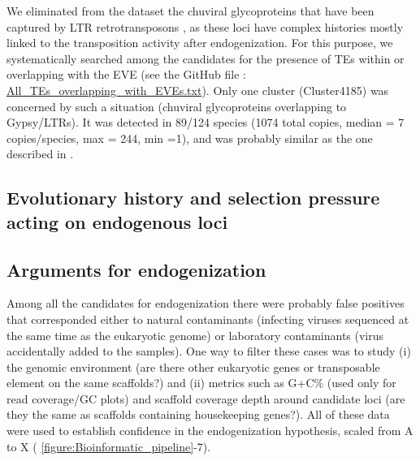 We eliminated from the dataset the chuviral glycoproteins that have been captured by LTR retrotransposons \citep{dezordi_and_2020}, as these loci have complex histories mostly linked to the transposition activity after endogenization. For this purpose, we systematically searched among the candidates for the presence of TEs within or overlapping with the EVE (see the GitHub file : \href{https://github.com/BenjaminGuinet/PhD_defense/blob/main/Supplementary_paper1/All_TEs_overlapping_with_EVEs.txt}{All\_TEs\_overlapping\_with\_EVEs.txt}). Only one cluster (Cluster4185) was concerned by such a situation (chuviral glycoproteins overlapping to Gypsy/LTRs). It was detected in 89/124 species (1074 total copies, median = 7 copies/species, max = 244, min =1), and was probably similar as the one described in \citep{li_unprecedented_2015}. 

\subsection{Evolutionary history and selection pressure acting on endogenous loci}

\subsection{Arguments for endogenization} 
\label{sec:MM-5}

Among all the candidates for endogenization there were probably false positives that corresponded either to natural contaminants (infecting viruses sequenced at the same time as the eukaryotic genome) or laboratory contaminants (virus accidentally added to the samples). One way to filter these cases was to study (i) the genomic environment (are there other eukaryotic genes or transposable element on the same scaffolds?) and (ii) metrics such as G+C\% (used only for read coverage/GC plots) and scaffold coverage depth around candidate loci (are they the same as scaffolds containing housekeeping genes?). All of these data were used to establish confidence in the endogenization hypothesis, scaled from A to X (\figurename{ \ref{figure:Bioinformatic_pipeline}}-7).

